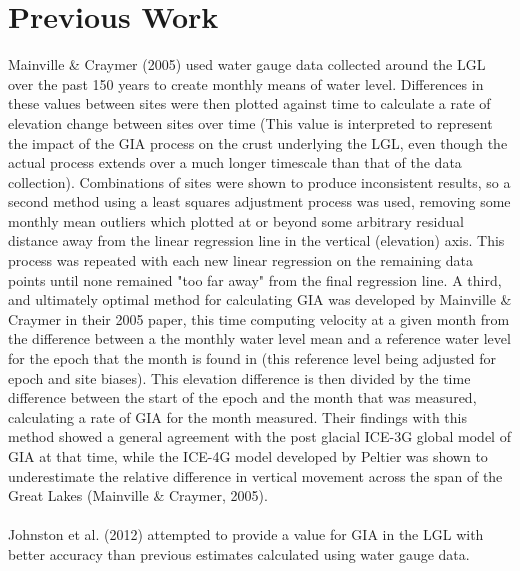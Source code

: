 \section{Previous Work} 
Mainville \& Craymer (2005) used water gauge data collected around the LGL over the past 150 years to
 create monthly means of water level. Differences in these values between sites
 were then plotted against time to calculate a rate of elevation change between
 sites over time (This value is interpreted to represent the impact of the GIA
 process on the crust underlying the LGL, even though the actual process extends
 over a much longer timescale than that of the data collection). Combinations of sites were shown to produce
 inconsistent results, so a second method using a least squares adjustment process was used,
 removing some monthly mean outliers which plotted at or beyond some arbitrary residual distance away 
 from the linear regression line in the vertical (elevation) axis. 
 This process was repeated with each new linear regression on the remaining data
 points until none remained "too far away" from
 the final regression line. A third, and ultimately optimal method for calculating
 GIA was developed by
 Mainville \& Craymer in their 2005 paper, this time computing velocity at a given
 month from the difference between a
 the monthly water level mean and a reference water level for the epoch that the 
 month is found in (this 
 reference level being adjusted for epoch
 and site biases). This elevation difference is then divided by the time difference
 between the start of the epoch and the month that was measured, calculating a rate
 of GIA for the month measured. Their findings with this method showed a general agreement with the post glacial
 ICE-3G global model of GIA at that time, while the ICE-4G model developed by Peltier
 was shown to underestimate the relative difference in vertical movement across
 the span of the Great Lakes (Mainville \& Craymer, 2005).\\ \\
Johnston et al. (2012) attempted to provide a value for GIA in the LGL with
 better accuracy than previous estimates calculated using water
 gauge data.
 
